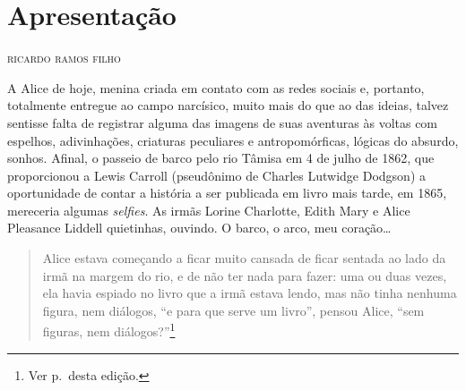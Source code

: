 
\blankpage
\chapter*{Apresentação\smallskip{}}

\vspace*{-.5\baselineskip}

\begin{flushright}
\textsc{ricardo ramos filho}
\end{flushright}

\noindent A Alice de hoje, menina criada em contato com as redes sociais e,
portanto, totalmente entregue ao campo narcísico, muito mais do que ao
das ideias, talvez sentisse falta de registrar alguma das imagens de
suas aventuras às voltas com espelhos, adivinhações, criaturas
peculiares e antropomórficas, lógicas do absurdo, sonhos. Afinal, o
passeio de barco pelo rio Tâmisa em 4 de julho de 1862, que proporcionou
a Lewis Carroll (pseudônimo de Charles Lutwidge Dodgson) a oportunidade
de contar a história a ser publicada em livro mais tarde, em 1865,
mereceria algumas \emph{selfies}. As irmãs Lorine Charlotte, Edith Mary
e Alice Pleasance Liddell quietinhas, ouvindo. O barco, o arco, meu
coração\ldots{}

\begin{quote}
Alice estava começando a ficar muito cansada de ficar sentada ao
lado da irmã na margem do rio, e de não ter nada para fazer: uma ou duas
vezes, ela havia espiado no livro que a irmã estava lendo, mas não tinha
nenhuma figura, nem diálogos, ``e para que serve um livro'', pensou
Alice, ``sem figuras, nem diálogos?''\footnote{Ver p.\,\pageref{ref1} desta edição.}
\end{quote}


